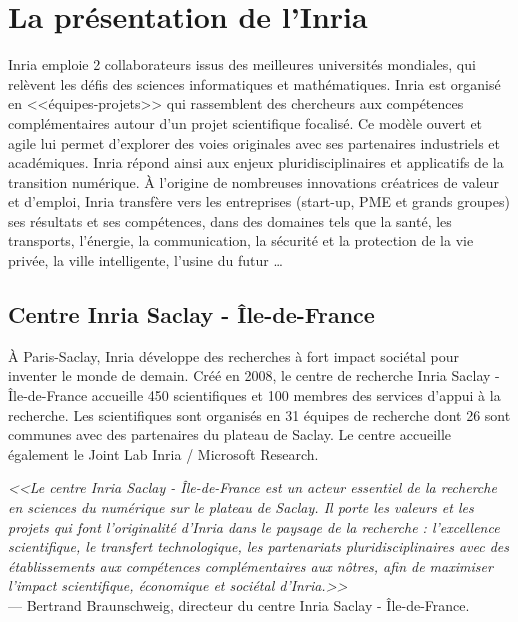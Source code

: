 \documentclass[a4paper, titlepage, 11pt]{article}
\theoremstyle{definition}
\theoremstyle{remark}
\begin{document}
\setcounter{tocdepth}{1}
\tableofcontents
\newpage

\section{La présentation de l'Inria}\label{sec:presInria}

Inria emploie 2 collaborateurs issus des meilleures universités mondiales, qui relèvent les défis des sciences informatiques et mathématiques. Inria est organisé en <<équipes-projets>> qui rassemblent des chercheurs aux compétences complémentaires autour d’un projet scientifique focalisé. Ce modèle ouvert et agile lui permet d’explorer des voies originales avec ses partenaires industriels et académiques. Inria répond ainsi aux enjeux pluridisciplinaires et applicatifs de la transition numérique. À l'origine de nombreuses innovations créatrices de valeur et d'emploi, Inria transfère vers les entreprises (start-up, PME et grands groupes) ses résultats et ses compétences, dans des domaines tels que la santé, les transports, l'énergie, la communication, la sécurité et la protection de la vie privée, la ville intelligente, l’usine du futur …

\subsection{Centre Inria Saclay - Île-de-France}

À Paris-Saclay, Inria développe des recherches à fort impact sociétal pour inventer le monde de demain. Créé en 2008, le centre de recherche Inria Saclay - Île-de-France accueille 450 scientifiques et 100 membres des services d’appui à la recherche. Les scientifiques sont organisés en 31 équipes de recherche dont 26 sont communes avec des partenaires du plateau de Saclay. Le centre accueille également le Joint Lab Inria / Microsoft Research.

\textit{<<Le centre Inria Saclay - Île-de-France est un acteur essentiel de la recherche en sciences du numérique sur le plateau de Saclay. Il porte les valeurs et les projets qui font l’originalité d’Inria dans le paysage de la recherche : l’excellence scientifique, le transfert technologique, les partenariats pluridisciplinaires avec des établissements aux compétences complémentaires aux nôtres, afin de maximiser l’impact scientifique, économique et sociétal d’Inria.>>} \\
--- Bertrand Braunschweig, directeur du centre Inria Saclay - Île-de-France.  
\end{document}
